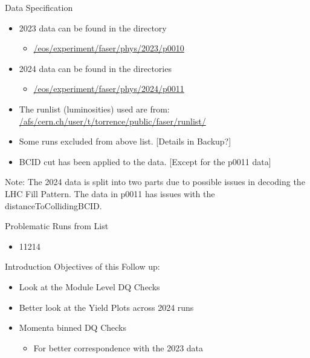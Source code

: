 \begin{frame}{Data Specification}
    \begin{itemize}
        \item 2023 data can be found in the directory
        \begin{itemize}
            \item \href{/eos/experiment/faser/phys/2023/p0010}{/eos/experiment/faser/phys/2023/p0010}
        \end{itemize}
        \item 2024 data can be found in the directories
        \begin{itemize}
            \item \href{/eos/experiment/faser/phys/2024/p0011, p0012}{/eos/experiment/faser/phys/2024/p0011}
        \end{itemize}
        \item The runlist (luminosities) used are from:
        \href{/afs/cern.ch/user/t/torrence/public/faser/runlist/2024/faser runlist 2024 stable.csv}{/afs/cern.ch/user/t/torrence/public/faser/runlist/}
        \item Some runs excluded from above list. [Details in Backup?]
        \item BCID cut has been applied to the data. [Except for the p0011 data]
    \end{itemize}
    
    Note: The 2024 data is split into two parts due to possible issues in decoding the LHC Fill Pattern. The data in p0011 has issues with the distanceToCollidingBCID.
\end{frame}

\begin{frame}{Problematic Runs from List}
    \begin{itemize}
        \item 11214
    \end{itemize}
    
\end{frame}
\begin{frame}{Introduction}
    Objectives of this Follow up:
    \begin{itemize}
        \item Look at the Module Level DQ Checks
        \item Better look at the Yield Plots across 2024 runs
        \item Momenta binned DQ Checks 
        \begin{itemize}
            \item For better correspondence with the 2023 data
        \end{itemize}
    \end{itemize}
\end{frame}